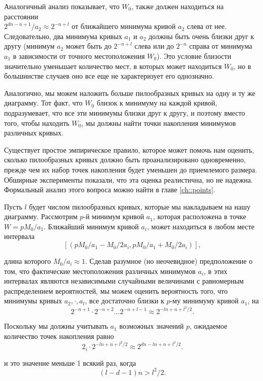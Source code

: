\documentclass[a4paper,12pt]{report}
\begin{document}
Аналогичный анализ показывает, что $W_0$, также должен находиться на расстоянии \\ $2^{dn - n + 1}/a_2 \approx 2^{-n + l}$ от ближайшего минимума кривой $a_2$ слева от нее. Следовательно, два минимума кривых $a_1$ и $a_2$ должны быть очень близки друг к другу (минимум $a_2$ может быть до $2^{-n + l}$ слева или до $2^{-n}$ справа от минимума $a_1$ в зависимости от точного местоположения $W_0$). Это условие близости значительно уменьшает количество мест, в которых может находиться $W_0$, но в большинстве случаев оно все еще не характеризует его однозначно.

Аналогично, мы можем наложить больше пилообразных кривых на одну и ту же диаграмму. Тот факт, что $W_0$ близок к минимуму на каждой кривой, подразумевает, что все эти минимумы близки друг к другу, и поэтому вместо того, чтобы находить $W_0$, мы должны найти точки накопления минимумов различных кривых.

Существует простое эмпирическое правило, которое может помочь нам оценить, сколько пилообразных кривых должно быть проанализировано одновременно, прежде чем их набор точек накопления будет уменьшен до приемлемого размера. Обширные эксперименты показали, что эта оценка реалистична, но не надежна. Формальный анализ этого вопроса можно найти в главе \ref{ch::points}.

Пусть $l$ будет числом пилообразных кривых, которые мы накладываем на нашу диаграмму. Рассмотрим $p$-й минимум кривой $a_1$, которая расположена в точке $W = pM_0/a_1$. Ближайший минимум кривой $a_i$, может находиться в любом месте интервала
\[
\ [(pM_0 / a_1 - M_0 / 2a_i, pM_0 / a_1 + M_0 / 2a_i)],
\]

\noindent длина которого $M_0/a_i \approx 1$. Сделав разумное (но неочевидное) предположение о том, что фактические местоположения различных минимумов $a_i$, в этих интервалах являются независимыми случайными величинами с равномерным распределением вероятностей, мы можем оценить вероятность того, что минимумы кривых $a_2,\cdot,a_l$, все достаточно близки к $p$-му минимуму кривой $a_1$, на
\[
\ 2^{- n + 1} \cdot 2^{- n + 2}\ldots2^{- n + l - 1} \approx 2^{-ln+n+l^{2} / 2}.
\]

\noindent Поскольку мы должны учитывать $a_1$ возможных значений $p$, ожидаемое количество точек накопления равно
\[
\ 2_i \cdot 2^{-ln + n + l^{2} / 2} \approx 2^{dn - ln + n + l^{2} / 2}.
\]

\noindent и это значение меньше 1 всякий раз, когда
\[
\ (l - d - 1)n > l^{2} / 2.
\]
\end{document}

